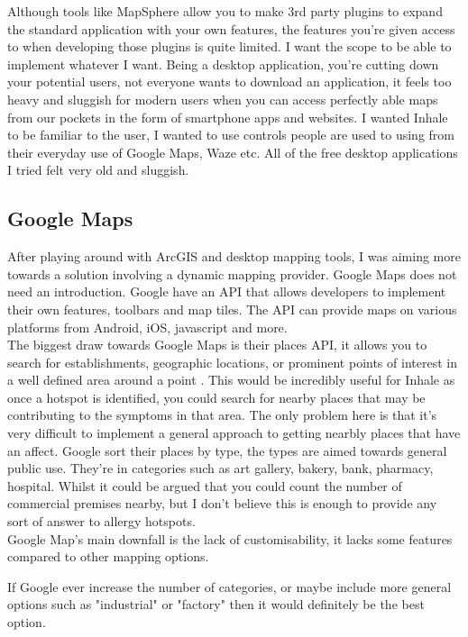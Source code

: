 Although tools like MapSphere allow you to make 3rd party plugins to expand the standard application with your own features, the features you're given access to when developing those plugins is quite limited. I want the scope to be able to implement whatever I want. 
Being a desktop application, you're cutting down your potential users, not everyone wants to download an application, it feels too heavy and sluggish for modern users when you can access perfectly able maps from our pockets in the form of smartphone apps and websites. I wanted Inhale to be familiar to the user, I wanted to use controls people are used to using from their everyday use of Google Maps, Waze etc. All of the free desktop applications I tried felt very old and sluggish.\\

\subsection{Google Maps}

After playing around with ArcGIS and desktop mapping tools, I was aiming more towards a solution involving a dynamic mapping provider. Google Maps does not need an introduction. Google have an API that allows developers to implement their own features, toolbars and map tiles. The API can provide maps on various platforms from Android, iOS, javascript and more.\\

The biggest draw towards Google Maps is their places API, it allows you to search for establishments, geographic locations, or prominent points of interest in a well defined area around a point \cite{googlePlaces}. This would be incredibly useful for Inhale as once a hotspot is identified, you could search for nearby places that may be contributing to the symptoms in that area. The only problem here is that it's very difficult to implement a general approach to getting nearbly places that have an affect. Google sort their places by type, the types are aimed towards general public use. They're in categories such as art gallery, bakery, bank, pharmacy, hospital. Whilst it could be argued that you could count the number of commercial premises nearby, but I don't believe this is enough to provide any sort of answer to allergy hotspots.\\

Google Map's main downfall is the lack of customisability, it lacks some features compared to other mapping options.

If Google ever increase the number of categories, or maybe include more general options such as "industrial" or "factory" then it would definitely be the best option.\\

